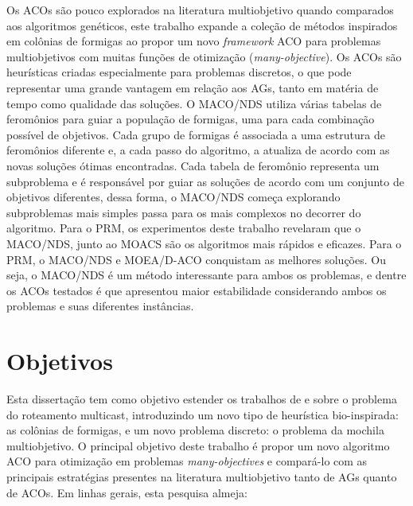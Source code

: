 Os \acp{ACO} são pouco explorados na literatura multiobjetivo quando comparados aos algoritmos genéticos, este trabalho expande a coleção de métodos inspirados em colônias de formigas ao propor um novo \textit{framework} ACO para problemas multiobjetivos com muitas funções de otimização (\textit{many-objective}). Os ACOs são heurísticas criadas especialmente para problemas discretos, o que pode representar uma grande vantagem em relação aos AGs, tanto em matéria de tempo como qualidade das soluções. O MACO/NDS utiliza várias tabelas de feromônios para guiar a população de formigas, uma para cada combinação possível de objetivos. Cada grupo de formigas é associada a uma estrutura de feromônios diferente e, a cada passo do algoritmo, a atualiza de acordo com as novas soluções ótimas encontradas. Cada tabela de feromônio representa um subproblema e é responsável por guiar as soluções de acordo com um conjunto de objetivos diferentes, dessa forma, o MACO/NDS começa explorando subproblemas mais simples passa para os mais complexos no decorrer do algoritmo. Para o PRM, os experimentos deste trabalho revelaram que o MACO/NDS, junto ao MOACS são os algoritmos mais rápidos e eficazes. Para o PRM, o MACO/NDS e MOEA/D-ACO conquistam as melhores soluções. Ou seja, o MACO/NDS é um método interessante para ambos os problemas, e dentre os ACOs testados é que apresentou maior estabilidade considerando ambos os problemas e suas diferentes instâncias.

\section{Objetivos}
Esta dissertação tem como objetivo estender os trabalhos de \cite{Lafeta2016} e \cite{Bueno2010} sobre o problema do roteamento multicast, introduzindo um novo tipo de heurística bio-inspirada: as colônias de formigas, e um novo problema discreto: o problema da mochila multiobjetivo. O principal objetivo deste trabalho é propor um novo algoritmo ACO para otimização em problemas \textit{many-objectives} e compará-lo com as principais estratégias presentes na literatura multiobjetivo tanto de AGs quanto de ACOs. Em linhas gerais, esta pesquisa almeja:
 
